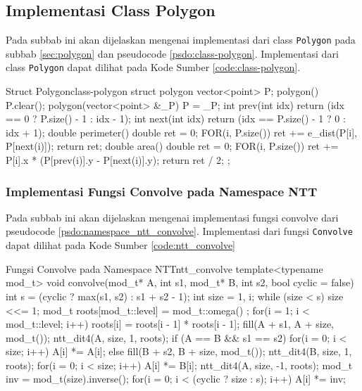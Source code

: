 \subsection{Implementasi Class Polygon}
Pada subbab ini akan dijelaskan mengenai implementasi dari class \texttt{Polygon} pada subbab \ref{sec:polygon} dan pseudocode \ref{psdo:class-polygon}. Implementasi dari class \texttt{Polygon} dapat dilihat pada Kode Sumber \ref{code:class-polygon}.

\begin{code}[firstnumber=1]{Struct Polygon}{class-polygon}
struct polygon{
	vector<point> P;
	polygon(){
		P.clear();
	}
	polygon(vector<point> &_P){
		P = _P;
	}
	int prev(int idx){
		return (idx == 0 ? P.size() - 1 : idx - 1);
	}
	int next(int idx){
		return (idx == P.size() - 1 ? 0 : idx + 1);
	}
	double perimeter(){
		double ret = 0;
		FOR(i, P.size()){
			ret += e_dist(P[i], P[next(i)]);
		}
		return ret;
	}
	double area(){
		double ret = 0;
		FOR(i, P.size()){
			ret += P[i].x * (P[prev(i)].y - P[next(i)].y);
		}
		return ret / 2;
	}
};
\end{code}

\subsubsection{Implementasi Fungsi Convolve pada Namespace NTT}
Pada subbab ini akan dijelaskan mengenai implementasi fungsi convolve dari pseudocode \ref{psdo:namespace_ntt_convolve}. Implementasi dari fungsi \texttt{Convolve} dapat dilihat pada Kode Sumber \ref{code:ntt_convolve}

\begin{code}[firstnumber=1]{Fungsi Convolve pada Namespace NTT}{ntt_convolve}
	template<typename mod_t>
    void convolve(mod_t* A, int s1, mod_t* B, int s2, bool cyclic = false) {
        int s = (cyclic ? max(s1, s2) : s1 + s2 - 1);
        int size = 1, i;
        while (size < s) size <<= 1;
        mod_t roots[mod_t::level] = { mod_t::omega() };
        for(i = 1; i < mod_t::level; i++) roots[i] = roots[i - 1] * roots[i - 1];
        fill(A + s1, A + size, mod_t()); ntt_dit4(A, size, 1, roots);
        if (A == B && s1 == s2) {
            for(i = 0; i < size; i++) A[i] *= A[i];
        } else {
            fill(B + s2, B + size, mod_t()); ntt_dit4(B, size, 1, roots);
            for(i = 0; i < size; i++)  A[i] *= B[i];
        }
        ntt_dit4(A, size, -1, roots);
        mod_t inv = mod_t(size).inverse();
        for(i = 0; i < (cyclic ? size : s); i++) A[i] *= inv;
    }
\end{code}

